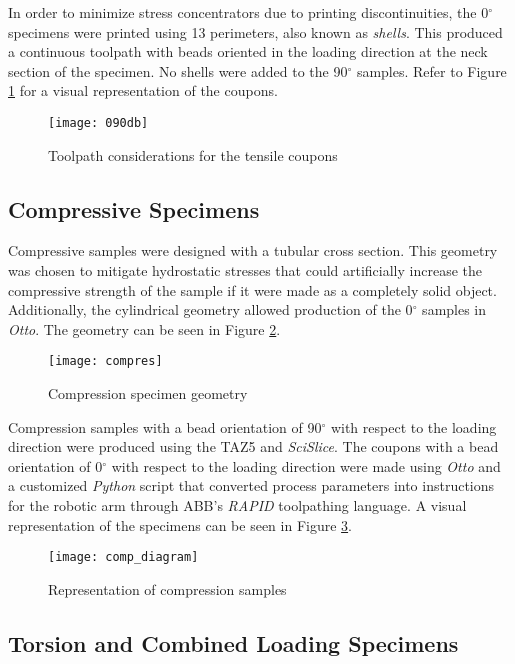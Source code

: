 \documentclass[main.tex]{subfiles}
\begin{document}
In order to minimize stress concentrators due to printing discontinuities, the 0$^\circ$ specimens were printed using 13 perimeters, also known as \emph {shells}. This produced a continuous toolpath with beads oriented in the loading direction at the neck section of the specimen. No shells were added to the 90$^\circ$ samples. Refer to Figure \ref{fig:090db} for a visual representation of the coupons. 

\begin{figure}[h]
	\center
	\texttt{[image: 090db]}
	\caption{Toolpath considerations for the tensile coupons} \label{fig:090db}
\end{figure}

\subsection{Compressive Specimens}

Compressive samples were designed with a tubular cross section. This geometry was chosen to mitigate hydrostatic stresses that could artificially increase the compressive strength of the sample if it were made as a completely solid object. Additionally, the cylindrical geometry allowed production of the 0$^\circ$ samples in \emph{Otto}. The geometry can be seen in Figure \ref{fig:comp}.
\begin{figure}[h]
	\center
	\texttt{[image: compres]}
	\caption{Compression specimen geometry} \label{fig:comp}
\end{figure}

Compression samples with a bead orientation of 90$^\circ$ with respect to the loading direction were produced using the TAZ5 and \emph{SciSlice}. The coupons with a bead orientation of 0$^\circ$ with respect to the loading direction were made using \emph{Otto} and a customized \emph{Python} script that converted process parameters into instructions for the robotic arm through ABB's \emph{RAPID} toolpathing language. A visual representation of the specimens can be seen in Figure \ref{fig:comp_d}. 
\begin{figure}[h]
	\center
	\texttt{[image: comp\_diagram]}
	\caption{Representation of compression samples} \label{fig:comp_d}
\end{figure}

\subsection{Torsion and Combined Loading Specimens}
\end{document}
